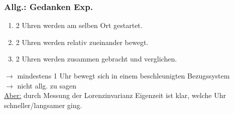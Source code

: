 \documentclass[titlepage,12pt,a4paper,ngerman]{report}
\begin{document}
{\subsubsection{Allg.: Gedanken Exp.}
\begin{enumerate}[1)]
	\item 2 Uhren werden am selben Ort gestartet.
	\item 2 Uhren werden relativ zueinander bewegt.
	\item 2 Uhren werden zusammen gebracht und verglichen.
\end{enumerate}
$ \rightarrow $ mindestens 1 Uhr bewegt sich in einem beschleunigten Bezugssystem\\
$ \rightarrow $ nicht allg. zu sagen \\[5pt]
\underline{Aber:} durch Messung der Lorenzinvarianz Eigenzeit ist klar, welche Uhr schneller/langsamer ging.

}
\end{document}
